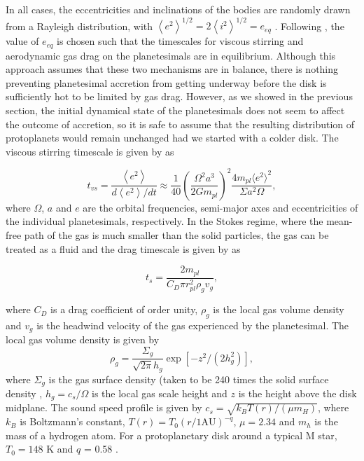 In all cases, the eccentricities and inclinations of the bodies are randomly drawn from a Rayleigh distribution, with $\left< e^{2} \right>^{1/2} = 2\left<i^{2} \right>^{1/2} = e_{eq}$ \cite{ida93}. Following \cite{kokubo98}, the value of $e_{eq}$ is chosen such that the timescales for viscous stirring and aerodynamic gas drag on the planetesimals are in equilibrium. Although this approach assumes that these two mechanisms are in balance, there is nothing preventing planetesimal accretion from getting underway before the disk is sufficiently hot to be limited by gas drag. However, as we showed in the previous section, the initial dynamical state of the planetesimals does not seem to affect the outcome of accretion, so it is safe to assume that the resulting distribution of protoplanets would remain unchanged had we started with a colder disk. The viscous stirring timescale is given by \cite{ida93} as

\begin{equation}\label{eq:vs_timescale}
    t_{vs}  = \frac{\left< e^2 \right>}{d \left< e^2 \right> / dt} \approx \frac{1}{40}\left(\frac{\Omega^{2} a^{3}}{2 G m_{pl}}\right)^{2} \frac{4 m_{pl} \langle e^{2} \rangle^{2}}{\Sigma a^{2} \Omega},
\end{equation}
where $\Omega$, $a$ and $e$ are the orbital frequencies, semi-major axes and eccentricities of the individual planetesimals, respectively. In the Stokes regime, where the mean-free path of the gas is much smaller than the solid particles, the gas can be treated as a fluid and the drag timescale is given by \cite{adachi76} as

\begin{equation}\label{eq:ts_stokes}
    t_{s} = \frac{2 m_{pl}}{C_{D} \pi r_{pl}^{2} \rho_{g} v_{g}},
\end{equation}

where $C_{D}$ is a drag coefficient of order unity, $\rho_{g}$ is the local gas volume density and $v_{g}$ is the headwind velocity of the gas experienced by the planetesimal. The local gas volume density is given by
\begin{equation}\label{eq:rho_gas}
	\rho_{g} = \frac{\Sigma_{g}}{\sqrt{2 \pi} h_{g}} \exp\left[ -z^{2} / \left( 2 h_{g}^{2} \right) \right],
\end{equation}
where $\Sigma_{g}$ is the gas surface density (taken to be
240 times the solid surface density \cite{hayashi81}, $h_{g} = c_{s} / \Omega$ is the local gas scale height and $z$ is the height above the disk midplane. The sound speed profile is given by $c_{s} = \sqrt{k_{B} T(r) / \left( \mu m_{H} \right)}$, where $k_{B}$ is Boltzmann's constant, $T(r) = T_{0} \left( r / 1 \textrm{AU} \right)^{-q}$, $\mu = 2.34$ and $m_{h}$ is the mass of a hydrogen atom. For a protoplanetary disk around a typical M star, $T_{0} = 148$ K and $q$ = 0.58 \cite{andrews05}.

